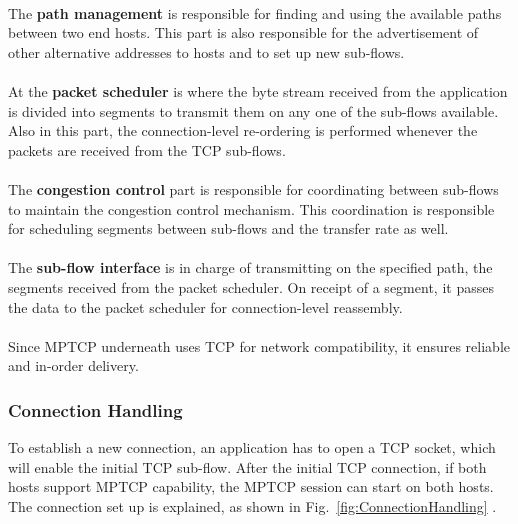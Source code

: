 \paragraph{} The \textbf{path management} is responsible for finding and using the available paths between two end hosts.
This part is also responsible for the advertisement of other alternative addresses to hosts and to set up new sub-flows.

\paragraph{} At the \textbf{packet scheduler} is where the byte stream received from the application is divided into
segments to transmit them on any one of the sub-flows available. Also in this part, the
connection-level re-ordering is performed whenever the packets are received from the TCP sub-flows.

\paragraph{} The \textbf{congestion control} part is responsible for coordinating between sub-flows to maintain the congestion control mechanism. This coordination is responsible for scheduling segments between sub-flows and the transfer rate as well.

\paragraph{} The \textbf{sub-flow interface} is in charge of transmitting on the specified path, the segments received from
the packet scheduler. On receipt of a segment, it passes the data to the packet scheduler for connection-level reassembly.

\paragraph{} Since MPTCP underneath uses TCP for network compatibility, it ensures reliable and in-order delivery.

\subsubsection{Connection Handling}
To establish a new connection, an application has to open a TCP socket, which will enable the initial TCP sub-flow. After the initial TCP connection, if both hosts support MPTCP capability, the MPTCP session can start on both hosts. The connection set up is explained, as shown in Fig.~\ref{fig:ConnectionHandling} \cite{barreia2014multipath}.
